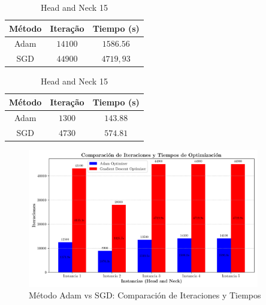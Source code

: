 \documentclass[a4paper,12pt]{article}
\begin{document}
\vspace{-0.5cm}
\begin{table}[!ht]
    \centering
    \caption{Head and Neck 15}
    \begin{minipage}[t]{0.45\textwidth}
        \centering
        \label{tab:tab1}
        \begin{tabular}{ccc}
            \hline
            Método & Iteração & Tiempo (s)\\
            \hline
            Adam & $14100$ &  $1586.56$ \\
            SGD & $44900$ & $4719,93$ \\
            \hline
        \end{tabular}
    \end{minipage}
    \hfill
    \begin{minipage}[t]{0.45\textwidth}
        \centering
        \label{tab:tab2}
        \begin{tabular}{ccc}
            \hline
            Método & Iteração & Tiempo (s) \\
            \hline
            Adam & $1300$ &   $143.88$  \\
            SGD &  $4730$ & $574.81$ \\
            \hline
        \end{tabular}
    \end{minipage}
\end{table}

\begin{figure}[!ht]
    \centering
    \includegraphics[width=0.9\textwidth]{../Graficos/comparacion_metodos.png}
    \caption{Método Adam vs SGD: Comparación de Iteraciones y Tiempos}
    \label{fig:exemplo}
  \end{figure}
\end{document}
